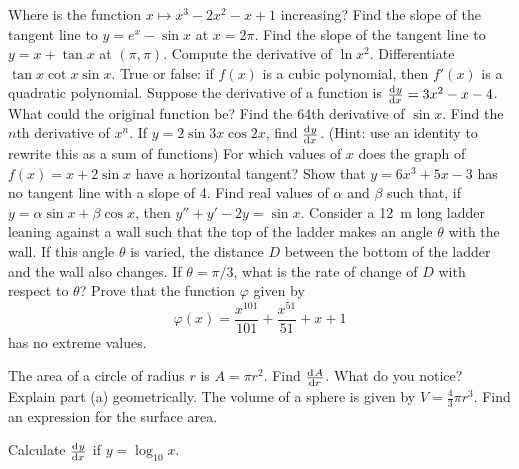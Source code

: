 \begin{questions}
  \questioA Where is the function $ x \mapsto x^3 - 2x^2 - x + 1 $ increasing?
  \questioA Find the slope of the tangent line to $ y = e^x - \sin x $ at $ x = 2\pi $.
  \questioA Find the slope of the tangent line to $ y = x + \tan x $ at $ (\pi, \pi) $.
  \questioA Compute the derivative of $ \ln x^2 $.
  \questioA Differentiate $ \tan x \cot x \sin x $.
  \questioA True or false: if $ f(x) $ is a cubic polynomial, then $ f'(x) $ is a quadratic polynomial.
  \questioA Suppose the derivative of a function is $ \od{y}{x} = 3x^2 - x - 4 $. What could the original function be?
  \questioM Find the 64th derivative of $ \sin x $.
  \questioM Find the $ n$th derivative of $ x^n $.
  \questioM If $ y = 2\sin 3x \cos 2x $, find $ \od{y}{x} $. (Hint: use an identity to rewrite this as a sum of functions)
  \questioM For which values of $ x $ does the graph of $ f(x) = x + 2\sin x $ have a horizontal tangent?
  \questioE Show that $ y = 6x^3 + 5x - 3 $ has no tangent line with a slope of 4.
  \questioE Find real values of $ \alpha $ and $ \beta $ such that, if $ y = \alpha \sin x + \beta \cos x $,
            then $ y'' + y' -2y = \sin x $.
  \questioE Consider a \SI{12}{\metre} long ladder leaning against a wall such that the top of the ladder makes an
            angle $ \theta $ with the wall. If this angle $ \theta $ is varied, the distance $ D $ between the bottom
            of the ladder and the wall also changes. If $ \theta = \pi/3 $, what is the rate of change of $ D $ with
            respect to $ \theta $?
  \questioE Prove that the function $ \varphi $ given by
            \begin{displaymath}
              \varphi(x) = \frac{x^{101}}{101} + \frac{x^{51}}{51} + x + 1
            \end{displaymath}
            has no extreme values.
  \question
    \begin{parts}
      \parA The area of a circle of radius $ r $ is $ A = \pi r^2 $. Find $ \od{A}{r} $. What do you notice?
      \parM Explain part (a) geometrically.
      \parE The volume of a sphere is given by $ V = \frac{4}{3} \pi r^3 $. Find an expression for the surface area.
    \end{parts}
  \questioE Calculate $ \od{y}{x} $ if $ y = \log_{10} x $.
\end{questions}

